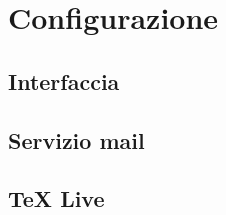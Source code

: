 \chapter{Configurazione}
\label{Configurazione}
\thispagestyle{empty}

\section{Interfaccia}

\section{Servizio mail}

\section{TeX Live}